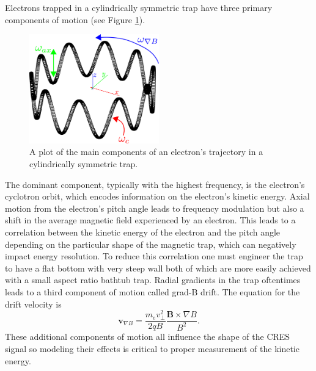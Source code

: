 Electrons trapped in a cylindrically symmetric trap have three primary components of motion (see Figure \ref{fig:chap3-trapped-electron-motion}).
\begin{figure}[htbp]
    \centering
    \includegraphics[width=0.5\textwidth]{figs/Chapter-3/230511_trapped_motion.png}
    \caption{A plot of the main components of an electron's trajectory in a cylindrically symmetric trap.}
    \label{fig:chap3-trapped-electron-motion}
\end{figure}
The dominant component, typically with the highest frequency, is the electron's cyclotron orbit, which encodes information on the electron's kinetic energy. Axial motion from the electron's pitch angle leads to frequency modulation but also a shift in the average magnetic field experienced by an electron. This leads to a correlation between the kinetic energy of the electron and the pitch angle depending on the particular shape of the magnetic trap, which can negatively impact energy resolution. To reduce this correlation one must engineer the trap to have a flat bottom with very steep wall both of which are more easily achieved with a small aspect ratio bathtub trap. Radial gradients in the trap oftentimes leads to a third component of motion called grad-B drift. The equation for the drift velocity is
\begin{equation}
    \mathbf{v}_{\nabla B} = \frac{m_e v_\perp^2}{2qB}\frac{\mathbf{B}\times\nabla B}{B^2}.
\end{equation}
These additional components of motion all influence the shape of the CRES signal so modeling their effects is critical to proper measurement of the kinetic energy.

